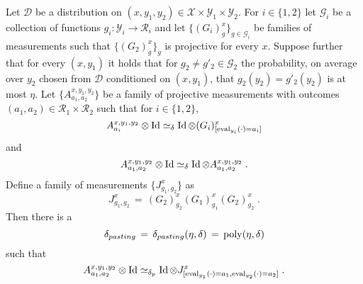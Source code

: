 \begin{lemma}
  \label{lem:pasting}
Let $\mathcal{D}$ be a distribution on $(x,y_1,y_2)\in \mathcal{X}\times \mathcal{Y}_1\times \mathcal{Y}_2$. For $i\in \{1,2\}$ let $\mathcal{G}_i$ be a collection of functions $g_i: \mathcal{Y}_i \to \mathcal{R}_i$ and let $\{(G_i)^{x}_{g}\}_{g\in \mathcal{G}_i}$ be families of measurements such that $\{(G_2)^x_g\}_g$ is projective for every $x$. Suppose further that for every $(x,y_1)$ it holds that for $g_2\neq g'_2 \in \mathcal{G}_2$ the probability, on average over $y_2$ chosen from $\mathcal{D}$ conditioned on $(x,y_1)$, that $g_2(y_2)=g'_2(y_2)$  is at most $\eta$. 
Let $\{A^{x,y_1,y_2}_{a_1,a_2}\}$ be a family of projective measurements with outcomes $(a_1,a_2)\in \mathcal{R}_1 \times \mathcal{R}_2$ such that for $i\in \{1,2\}$,
\begin{equation}
  \label{eq:pasting-1}
 A^{x,y_1,y_2}_{a_i} \otimes \mathop{\rm Id}\nolimits \simeq_\delta \mathop{\rm Id}\nolimits \otimes (G_i)^x_{[\mathrm{eval}_{y_i}(\cdot)=a_i]}
\end{equation}
and 
\begin{equation}
  \label{eq:pasting-2}
 A^{x,y_1,y_2}_{a_1,a_2} \otimes \mathop{\rm Id}\nolimits \simeq_\delta \mathop{\rm Id}\nolimits \otimes  A^{x,y_1,y_2}_{a_1,a_2}\;.
\end{equation}
Define a family of measurements $\{J^x_{g_1,g_2}\}$ as
\begin{equation}
  \label{eq:pasting-2a}
 J^x_{g_1,g_2} \,=\, (G_2)^x_{g_2} (G_1)^x_{g_1} (G_2)^x_{g_2}\;.
\end{equation}
Then there is a 
\begin{equation}
  \label{eq:def-deltap}
\delta_{pasting} \,=\, \delta_{pasting}(\eta,\delta)\,=\, \mathrm{poly}(\eta,\delta)
\end{equation} such that 
\begin{equation}
  \label{eq:pasting-3}
 A^{x,y_1,y_2}_{a_1,a_2} \otimes \mathop{\rm Id}\nolimits \simeq_{\delta_p} \mathop{\rm Id}\nolimits \otimes J^x_{[\mathrm{eval}_{y_1}(\cdot)=a_1,\mathrm{eval}_{y_2}(\cdot) = a_2]}\;.
\end{equation}
\end{lemma}






